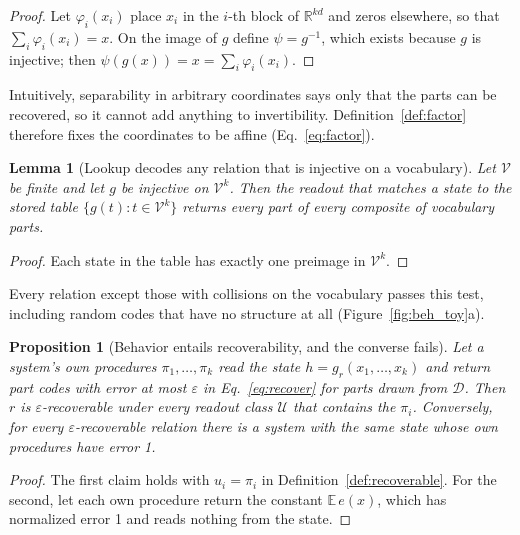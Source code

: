 \documentclass[10pt]{article}
\theoremstyle{plain}
\newtheorem{proposition}{Proposition}
\newtheorem{lemma}{Lemma}
\theoremstyle{remark}
\newcommand{\R}{\mathbb{R}}
\newcommand{\U}{\mathcal{U}}
\newcommand{\D}{\mathcal{D}}
\newcommand{\Voc}{\mathcal{V}}
\begin{document}
\begin{proof}
Let $\varphi_i(x_i)$ place $x_i$ in the $i$-th block of $\R^{kd}$ and zeros elsewhere, so that $\sum_i \varphi_i(x_i) = x$. On the image of $g$ define $\psi = g^{-1}$, which exists because $g$ is injective; then $\psi(g(x)) = x = \sum_i \varphi_i(x_i)$.
\end{proof}

\noindent
Intuitively, separability in arbitrary coordinates says only that the parts can be recovered, so it cannot add anything to invertibility. Definition~\ref{def:factor} therefore fixes the coordinates to be affine (Eq.~\ref{eq:factor}).

\begin{lemma}[Lookup decodes any relation that is injective on a vocabulary]
\label{lem:lookup}
Let $\Voc$ be finite and let $g$ be injective on $\Voc^k$. Then the readout that matches a state to the stored table $\{g(t) : t \in \Voc^k\}$ returns every part of every composite of vocabulary parts.
\end{lemma}

\begin{proof}
Each state in the table has exactly one preimage in $\Voc^k$.
\end{proof}

\noindent
Every relation except those with collisions on the vocabulary passes this test, including random codes that have no structure at all (Figure~\ref{fig:beh_toy}a).



\begin{proposition}[Behavior entails recoverability, and the converse fails]
\label{prop:subset}
Let a system's own procedures $\pi_1, \ldots, \pi_k$ read the state $h = g_r(x_1, \ldots, x_k)$ and return part codes with error at most $\varepsilon$ in Eq.~\eqref{eq:recover} for parts drawn from $\D$. Then $r$ is $\varepsilon$-recoverable under every readout class $\U$ that contains the $\pi_i$. Conversely, for every $\varepsilon$-recoverable relation there is a system with the same state whose own procedures have error 1.
\end{proposition}

\begin{proof}
The first claim holds with $u_i = \pi_i$ in Definition~\ref{def:recoverable}. For the second, let each own procedure return the constant $\mathbb{E}\,e(x)$, which has normalized error 1 and reads nothing from the state.
\end{proof}
\end{document}
